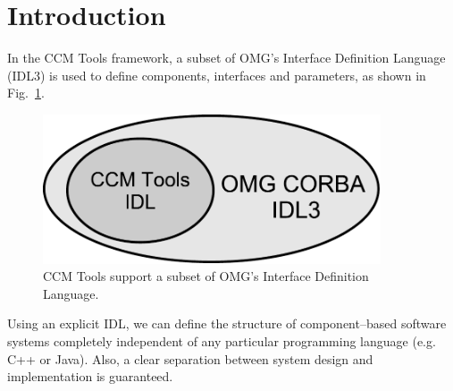 \section{Introduction}

In the CCM Tools framework, a subset of OMG's Interface Definition Language
(IDL3) is used to define components, interfaces and parameters, as shown in 
Fig.~\ref{figure:IDLSubSet}.

\begin{figure}[htbp]
    \begin{center}
        \includegraphics [width=10cm,angle=0] {figures/IDLSubSet}
        \caption{ CCM Tools support a subset of OMG's Interface Definition Language.}
        \label{figure:IDLSubSet}
    \end{center}
\end{figure}

Using an explicit IDL, we can define the structure of component--based
software systems completely independent of any particular programming 
language (e.g. C++ or Java).
Also, a clear separation between system design and implementation is 
guaranteed.

\newpage
